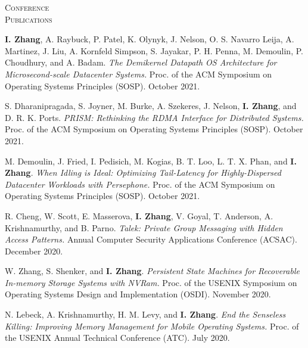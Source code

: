 \documentclass[10pt,times]{report}
\newlength{\sectiongap}
\newlength{\sectioncolwidth}
\newlength{\colgap}
\newlength{\stuffwidth}
\newenvironment{rtable}{
  \begin{minipage}{\textwidth}
  }{
  \end{minipage}
}
\newenvironment{rsection}[1]{
  \begin{minipage}[t]{\sectioncolwidth}
    \textsc{#1}
  \end{minipage}
  \hspace{\colgap}
  \begin{minipage}[t]{\stuffwidth}
  }{
    \removelastskip
  \end{minipage}
  \\[\sectiongap]
}
\begin{document}
\begin{rtable}
  
  \begin{rsection}{Conference\\Publications}
    \textbf{I. Zhang}, A. Raybuck, P. Patel, K. Olynyk, J. Nelson,
    O. S. Navarro Leija, A. Martinez, J. Liu, A. Kornfeld Simpson,
    S. Jayakar, P. H.  Penna, M. Demoulin, P. Choudhury, and
    A. Badam. \textit{The Demikernel Datapath OS Architecture for
      Microsecond-scale Datacenter Systems.  } Proc. of the ACM
    Symposium on Operating Systems Principles (SOSP). October
    2021. \\\vspace{-0.5em}

    S. Dharanipragada, S. Joyner, M. Burke, A.  Szekeres, J. Nelson,
    \textbf{I. Zhang}, and D. R. K. Ports. \textit{PRISM: Rethinking
      the RDMA Interface for Distributed Systems.}  Proc. of the
    ACM Symposium on Operating Systems Principles (SOSP). October
    2021. \\\vspace{-0.5em}

    M. Demoulin, J. Fried, I. Pedisich, M. Kogias, B. T. Loo,
    L. T. X. Phan, and \textbf{I. Zhang}. \textit{When Idling is
      Ideal: Optimizing Tail-Latency for Highly-Dispersed Datacenter
      Workloads with Persephone.  } Proc. of the ACM Symposium
    on Operating Systems Principles (SOSP). October
    2021. \\\vspace{-0.5em}

    R. Cheng, W. Scott, E. Masserova, \textbf{I. Zhang}, V. Goyal,
    T. Anderson, A. Krishnamurthy, and B. Parno. \textit{Talek:
      Private Group Messaging with Hidden Access Patterns.} Annual
    Computer Security Applications Conference (ACSAC). December
    2020. \\\vspace{-0.5em}

    W. Zhang, S. Shenker, and \textbf{I. Zhang}.  \textit{Persistent
      State Machines for Recoverable In-memory Storage Systems with
      NVRam.}  Proc. of the USENIX Symposium on Operating
    Systems Design and Implementation (OSDI). November
    2020. \\\vspace{-0.5em}
    
    N. Lebeck, A. Krishnamurthy, H. M. Levy, and
    \textbf{I. Zhang}. \textit{End the Senseless Killing: Improving
      Memory Management for Mobile Operating Systems.}  Proc. of
    the USENIX Annual Technical Conference (ATC). July
    2020. \\\vspace{-0.5em}


\end{rsection}
\end{rtable}
\end{document}
